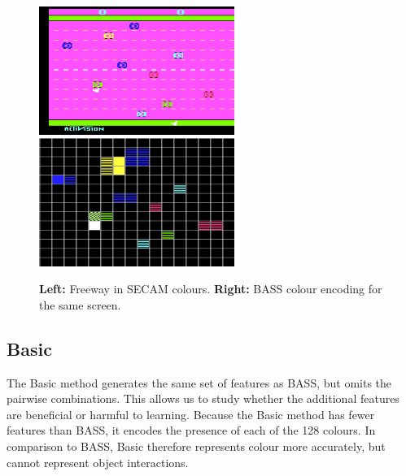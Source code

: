 \documentclass[twoside,11pt]{article}
\begin{document}
\begin{figure}[h!]
\begin{center}
\includegraphics[width=2.5in]{images/freeway_bass_real.png}
\includegraphics[width=2.5in]{images/freeway_bass_features.png}
\caption{\textbf{Left:} Freeway in SECAM colours. \textbf{Right:} BASS colour encoding for the same screen. \label{fig:agents:rl:bass:features}}
\end{center}
\end{figure}


\subsection{Basic}
\label{sec:agents:rl:basic}

The Basic method generates the same set of features as BASS, but omits the pairwise combinations. This allows us to study whether the additional features are beneficial or harmful to learning. Because the Basic method has fewer features than BASS, it encodes the presence of each of the 128 colours. In comparison to BASS, Basic therefore represents colour more accurately, but cannot represent object interactions. 
\end{document}
